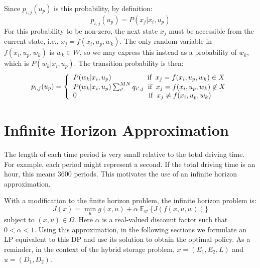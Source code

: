 \documentclass[conference]{IEEEtran}
\DeclareMathOperator{\E}{\mathbb{E}}
\begin{document}
Since $p_{i,j}(u_{p})$ is this probability, by definition: 
\begin{displaymath}
p_{i,j}(u_{p})= P(x_{j}| x_{i},u_{p})
\end{displaymath} For this probability to be non-zero, the next state $x_{j}$ must be accessible from the current state, i.e., $x_{j}=f(x_{i},u_{p},w_{k})$. %
The only random variable in $f(x_{i},u_{p},w_{k})$ is $w_{k}\in W$, so we may express this instead as a probability of $w_{k}$, which is $P(w_{k} | x_{i},u_{p})$. The transition probability is then:
\begin{equation} \label{eq:TransMtx}
p_{i,j}(u_{p})=
\left\{
\begin{array}{l}
P(w_{k}|x_{i},u_{p}) \hspace{1.8cm} \text{if} \hspace{0.2cm} x_{j}=f(x_{i},u_{p},w_{k})\in X\\
P(w_{k}|x_{i},u_{p})\sum_{i'}^{MN}q_{i',j} \hspace{0.2cm} \text{if} \hspace{0.2cm} x_{j}=f(x_{i},u_{p},w_{k})\not\in X\\
0 \hspace{3.6cm} \text{if} \hspace{0.2cm} x_{j}\neq f(x_{i},u_{p},w_{k})
\end{array}
\right.
\end{equation}




\section{Infinite Horizon Approximation}
The length of each time period is very small relative to the total driving time. For example, each period might represent a second. If the total driving time is an hour, this means 3600 periods. This motivates the use of an infinite horizon approximation.

With a modification to the finite horizon problem, the infinite horizon problem is:
\begin{equation} \label{eq:DP}
J(x)=\min_{u} g(x,u) + \alpha\mathop{\E}_{w} \{J(f(x,u,w))\}
\end{equation} subject to $(x,u)\in\Omega$. Here $\alpha$ is a real-valued discount factor such that $0<\alpha<1$. Using this approximation, in the following sections we formulate an LP equivalent to this DP and use its solution to obtain the optimal policy. As a reminder, in the context of the hybrid storage problem, $x=(E_{1},E_{2},L)$ and $u=(D_{1},D_{2})$.
\end{document}
